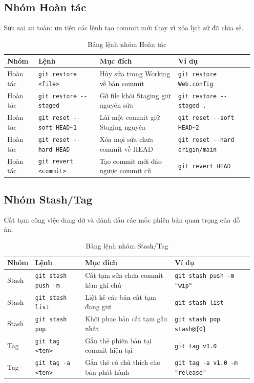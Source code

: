 \subsection{Nhóm Hoàn tác}
Sửa sai an toàn: ưu tiên các lệnh tạo commit mới thay vì xóa lịch sử đã chia sẻ.
\begin{table}[H]
\centering
\small
\begin{tabular}{p{1.7cm} p{3.2cm} p{4.5cm} p{4.6cm}}
\toprule
Nhóm & Lệnh & Mục đích & Ví dụ \\
\midrule
Hoàn tác & \verb|git restore <file>| & Hủy sửa trong Working về bản commit & \verb|git restore Web.config| \\
Hoàn tác & \verb|git restore --staged| & Gỡ file khỏi Staging giữ nguyên sửa & \verb|git restore --staged .| \\
Hoàn tác & \verb|git reset --soft HEAD~1| & Lùi một commit giữ Staging nguyên & \verb|git reset --soft HEAD~2| \\
Hoàn tác & \verb|git reset --hard HEAD| & Xóa mọi sửa chưa commit về HEAD & \verb|git reset --hard origin/main| \\
Hoàn tác & \verb|git revert <commit>| & Tạo commit mới đảo ngược commit cũ & \verb|git revert HEAD| \\
\bottomrule
\end{tabular}
\caption{Bảng lệnh nhóm Hoàn tác}
\label{tab:pa-hoantac}
\end{table}

\subsection{Nhóm Stash/Tag}
Cất tạm công việc đang dở và đánh dấu các mốc phiên bản quan trọng của đồ án.
\begin{table}[H]
\centering
\small
\begin{tabular}{p{1.7cm} p{3.2cm} p{4.5cm} p{4.6cm}}
\toprule
Nhóm & Lệnh & Mục đích & Ví dụ \\
\midrule
Stash & \verb|git stash push -m| & Cất tạm sửa chưa commit kèm ghi chú & \verb|git stash push -m "wip"| \\
Stash & \verb|git stash list| & Liệt kê các bản cất tạm đang giữ & \verb|git stash list| \\
Stash & \verb|git stash pop| & Khôi phục bản cất tạm gần nhất & \verb|git stash pop stash@{0}| \\
Tag & \verb|git tag <ten>| & Gắn thẻ phiên bản tại commit hiện tại & \verb|git tag v1.0| \\
Tag & \verb|git tag -a <ten>| & Gắn thẻ có chú thích cho bản phát hành & \verb|git tag -a v1.0 -m "release"| \\
\bottomrule
\end{tabular}
\caption{Bảng lệnh nhóm Stash/Tag}
\label{tab:pa-stash}
\end{table}

